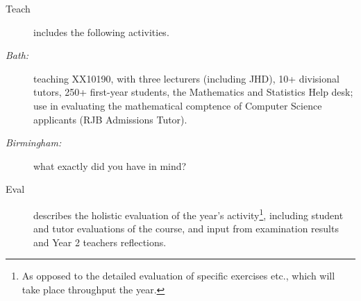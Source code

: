 \documentclass[11pt]{article}
\begin{document}
\begin{description}
\item[Teach]includes the following activities.
\item[\it Bath:]teaching XX10190, with three lecturers (including JHD), 10+ divisional tutors,  250+ first-year students, the Mathematics and Statistics Help desk; use in evaluating the mathematical comptence of Computer Science applicants (RJB Admissions Tutor).
\item[\it Birmingham:]what exactly did you have in mind?
\item[Eval]describes the holistic evaluation of the year's activity\footnote{As opposed to the detailed evaluation of specific exercises etc., which will take place throughput the year.}, including student and tutor evaluations of the course, and input from examination results and Year 2 teachers reflections.
\end{description}
\end{document}
